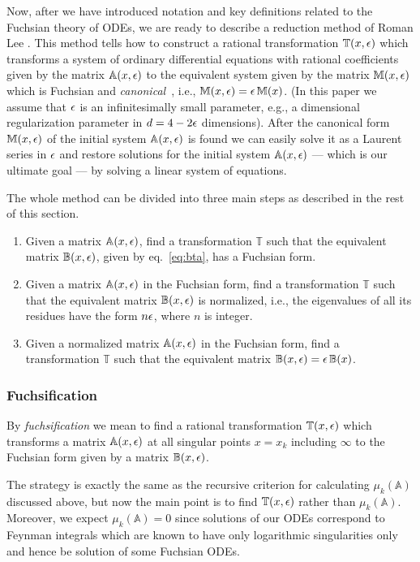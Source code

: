 \documentclass[12pt,a4paper]{article}
\def\M#1{\mathbb{#1}} %
\begin{document}
Now, after we have introduced notation and key definitions related to the Fuchsian theory of ODEs, we are ready to describe a reduction method of Roman Lee \cite{Lee15}.
This method tells how to construct a rational transformation $\M T(x,\eps)$ which transforms a system of ordinary differential equations with rational coefficients given by the matrix $\M A(x,\eps)$ to the equivalent system given by the matrix $\M M(x,\eps)$ which is Fuchsian and {\em canonical}~\cite{Henn13}, i.e., $\M M(x,\eps) = \eps\, \M M(x)$.
(In this paper we assume that $\epsilon$ is an infinitesimally small parameter, e.g., a dimensional regularization parameter in $d=4-2\epsilon$ dimensions).
After the canonical form $\M M(x,\eps)$ of the initial system $\M A(x,\eps)$ is found we can easily solve it as a Laurent series in $\epsilon$ and restore solutions for the initial system $\M A(x,\eps)$ --- which is our ultimate goal --- by solving a linear system of equations.

The whole method can be divided into three main steps as described in the rest of this section.

\begin{enumerate}
  \item Given a matrix $\M A(x,\eps)$, find a transformation $\M T$ such that the equivalent matrix $\M B(x,\eps)$, given by eq.~\eqref{eq:bta}, has a Fuchsian form.
  \item Given a matrix $\M A(x,\eps)$ in the Fuchsian form, find a transformation $\M T$ such that the equivalent matrix $\M B(x,\eps)$ is normalized, i.e., the eigenvalues of all its residues have the form $n \epsilon$, where $n$ is integer.
  \item Given a normalized matrix $\M A(x,\eps)$ in the Fuchsian form, find a transformation $\M T$ such that the equivalent matrix $\M B(x,\eps) = \eps \, \M B(x)$.
\end{enumerate}


\subsubsection{Fuchsification}

By {\em fuchsification} we mean to find a rational transformation $\M T(x,\eps)$ which transforms a matrix $\M A(x,\eps)$ at all singular points $x=x_k$ including $\infty$ to the Fuchsian form given by a matrix $\M B(x,\eps)$.

The strategy is exactly the same as the recursive criterion for calculating $\mu_k(\M A)$ discussed above, but now the main point is to find $\M T(x,\eps)$ rather than $\mu_k(\M A)$.
Moreover, we expect $\mu_k(\M A) = 0$ since solutions of our ODEs correspond to Feynman integrals which are known to have only logarithmic singularities only and hence be solution of some Fuchsian ODEs.
\end{document}
